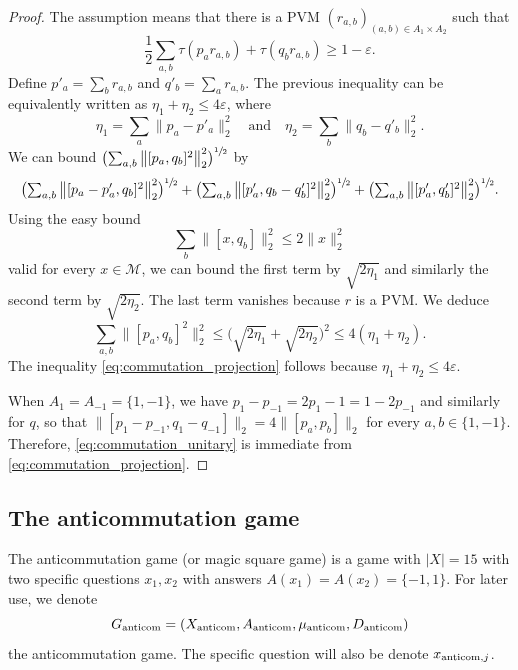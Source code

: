 \documentclass[10pt]{amsart}
\let\ts\textstyle
\theoremstyle{plain}
\theoremstyle{definition}
\newcommand{\cM}{\mathcal{M}}
\newcommand{\anticom}{\textup{anticom}}
\begin{document}
\begin{proof}
The assumption means that there is a PVM $(r_{a,b})_{(a,b)\in A_1 \times A_2}$ such that
\[
\frac 1 2 \sum_{a,b} \tau( p_a r_{a,b}) + \tau(q_b r_{a,b}) \geq 1-\varepsilon.
\]
Define $p'_a= \sum_b r_{a,b}$ and $q'_b = \sum_a r_{a,b}$. The previous inequality can be equivalently written as $\eta_1+\eta_2 \leq 4\varepsilon$, where
\[
\eta_1 = \sum_a \|p_a - p'_a\|_2^2
\quad
\text{and}
\quad
\eta_2 = \sum_b \|q_b - q'_b\|_2^2.
\]
We can bound $\bigl(\sum_{a,b} \big\|[p_a,q_b]^2\big\|_2^2\bigr)^{\sfrac 1 2}$ by
\[\ts
\bigl(\sum_{a,b} \big\|[p_a-p'_a,q_b]^2\big\|_2^2\bigr)^{\sfrac 1 2} + \bigl(\sum_{a,b} \big\|[p'_a,q_b-q'_b]^2\big\|_2^2\bigr)^{\sfrac 1 2} + \bigl(\sum_{a,b} \big\|[p'_a,q'_b]^2\big\|_2^2\bigr)^{\sfrac 1 2}.
\]
Using the easy bound
\[
\sum_b \big\|[x,q_b]\big\|_2^2 \leq 2 \|x\|_2^2
\]
valid for every $x \in \cM$, we can bound the first term by $\sqrt{2 \eta_1}$ and similarly the second term by $\sqrt{2 \eta_2}$. The last term vanishes because $r$ is a PVM. We deduce
\[
\sum_{a,b} \|[p_a,q_b]^2\|_2^2 \leq \bigl(\sqrt{2\eta_1}+\sqrt{2\eta_2}\bigr)^2 \leq 4(\eta_1+\eta_2).
\]
The inequality \eqref{eq:commutation_projection} follows because $\eta_1+\eta_2 \leq 4\varepsilon$.

When $A_1=A_{-1}=\{1,-1\}$, we have $p_1 - p_{-1} = 2p_1-1 =1-2p_{-1}$ and similarly for $q$, so that $\big\|[p_1-p_{-1},q_1-q_{-1}]\big\|_2 = 4\big\|[p_a,p_b]\big\|_2$ for every $a,b \in \{1,-1\}$. Therefore, \eqref{eq:commutation_unitary} is immediate from \eqref{eq:commutation_projection}.
\end{proof}

\subsection{The anticommutation game}
The anticommutation game (or magic square game) is a game with $|X|=15$ with two specific questions $x_1,x_2$ with answers $A(x_1) = A(x_2)=\{-1,1\}$. For later use, we denote \[
G_{\anticom}= (X_{\anticom},A_{\anticom},\mu_{\anticom},D_{\anticom})
\] the anticommutation game. The specific question will also be denote $x_{\anticom,j}$.
\end{document}
